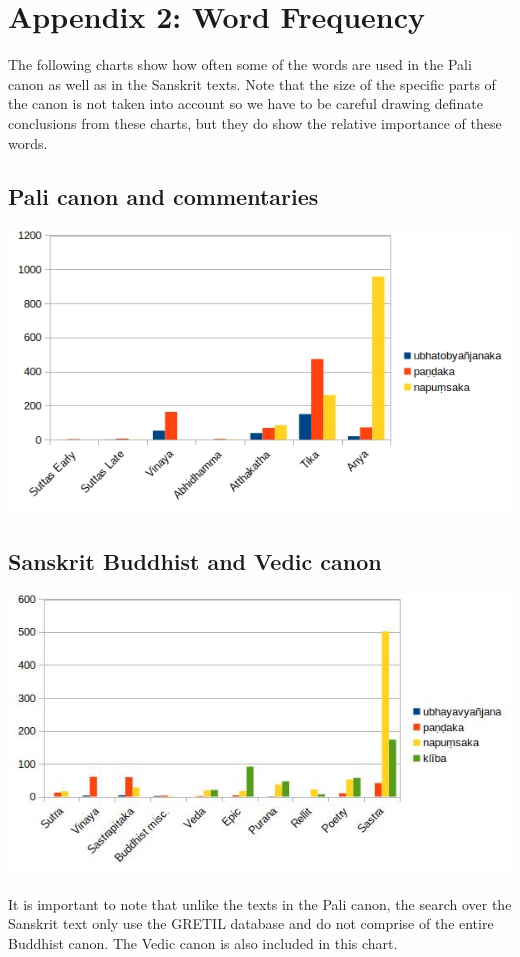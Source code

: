 \section{Appendix 2: Word Frequency}
\label{appendix2}

The following charts show how often some of the words are used in the Pali canon as well as in the Sanskrit texts. Note that the size of the specific parts of the canon is not taken into account so we have to be careful drawing definate conclusions from these charts, but they do show the relative importance of these words. 

\subsection{Pali canon and commentaries}

\includegraphics[width=\linewidth]{pali.jpg}
\label{pali1}

\subsection{Sanskrit Buddhist and Vedic canon}

\includegraphics[width=\linewidth]{sanskrit.jpg}
\label{sanskrit1}

\medskip
It is important to note that unlike the texts in the Pali canon, the search over the Sanskrit text only use the GRETIL database and do not comprise of the entire Buddhist canon. The Vedic canon is also included in this chart.





